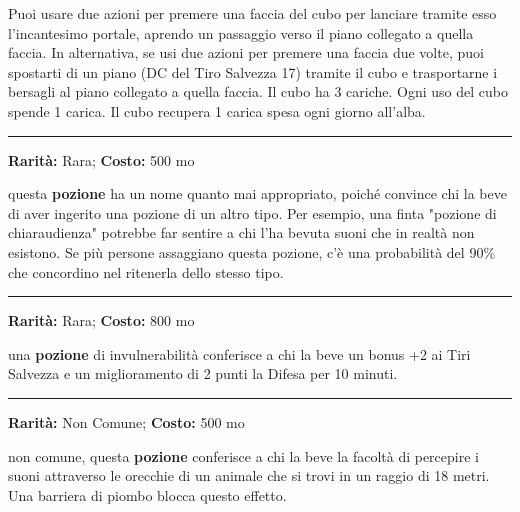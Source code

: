 \begin{multicols}{2}
Puoi usare due azioni per premere una faccia del cubo per lanciare tramite esso l'incantesimo portale, aprendo un passaggio verso il piano collegato a quella faccia. In alternativa, se usi due azioni per premere una faccia due volte, puoi spostarti di un piano (DC del Tiro Salvezza 17) tramite il cubo e trasportarne i bersagli al piano collegato a quella faccia. Il cubo ha 3 cariche. Ogni uso del cubo spende 1 carica. Il cubo recupera 1 carica spesa ogni giorno all'alba.

\smallskip\noindent\rule{\linewidth}{2pt}  \hypertarget{Pozionedell'Inganno}{}\medskip{}\noindent\label{Pozionedell'Inganno}

\textbf{Rarità:} Rara; \textbf{Costo:} 500 mo

questa \textbf{pozione} ha un nome quanto mai appropriato, poiché convince chi la beve di aver ingerito una pozione di un altro tipo. Per esempio, una finta "pozione di chiaraudienza" potrebbe far sentire a chi l'ha bevuta suoni che in realtà non esistono. Se più persone assaggiano questa pozione, c'è una probabilità del 90\% che concordino nel ritenerla dello stesso tipo.

\smallskip\noindent\rule{\linewidth}{2pt}  \hypertarget{Pozionedell'invulnerabilità}{}\medskip{}\noindent\label{Pozionedell'invulnerabilità}

\textbf{Rarità:} Rara; \textbf{Costo:} 800 mo

una \textbf{pozione} di invulnerabilità conferisce a chi la beve un bonus +2 ai Tiri Salvezza e un miglioramento di 2 punti la Difesa per 10 minuti.

\smallskip\noindent\rule{\linewidth}{2pt}  \hypertarget{PozionedellaChiaraudienzaanimale}{}\medskip{}\noindent\label{PozionedellaChiaraudienzaanimale}

\textbf{Rarità:} Non Comune; \textbf{Costo:} 500 mo

non comune, questa \textbf{pozione} conferisce a chi la beve la facoltà di percepire i suoni attraverso le orecchie di un animale che si trovi in un raggio di 18 metri. Una barriera di piombo blocca questo effetto.


\end{multicols}
